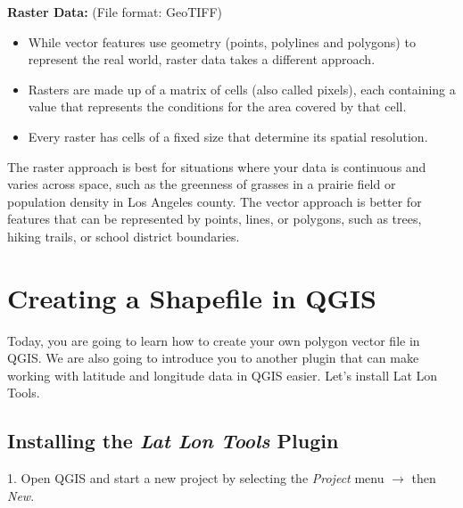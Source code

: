 \documentclass[oneside,a4paper,11pt,explicit]{book}
\begin{document}
\begin{tcolorbox}[colback=yellow!5!white,colframe=IceCreamLeaf,title=\textbf{Vector vs Raster Data}]
	\vspace{.5em}

	\textbf{Raster Data:} (File format: GeoTIFF)
	\begin{itemize}
		\item While vector features use geometry (points, polylines and polygons) to represent the real world, raster data takes a different approach. 
		\item Rasters are made up of a matrix of cells (also called pixels), each containing a value that represents the conditions for the area covered by that cell.
		\item Every raster has cells of a fixed size that determine its spatial resolution.
	\end{itemize}
\end{tcolorbox}

The raster approach is best for situations where your data is continuous and varies across space, such as the greenness of grasses in a prairie field or population density in Los Angeles county. The vector approach is better for features that can be represented by points, lines, or polygons, such as trees, hiking trails, or school district boundaries.

	
\section{Creating a Shapefile in QGIS}
	
	Today, you are going to learn how to create your own polygon vector file in QGIS. We are also going to introduce you to another plugin that can make working with latitude and longitude data in QGIS easier. Let's install Lat Lon Tools. 
	
	\subsection{Installing the \textit{Lat Lon Tools} Plugin}
	
	1. Open QGIS and start a new project by selecting the \textit{Project} menu $\rightarrow$ then \textit{New}. 
	
\end{document}
